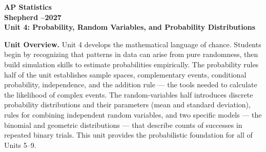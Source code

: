 \documentclass[10pt]{article}
\begin{document}
\vspace{-1.3in}

\begin{center}
  {\color{white}\bfseries\fontsize{28}{34}\selectfont AP Statistics}\\[8pt]
  {\color{goldacc}\bfseries\Large Shepherd --2027}\\[14pt]
  {\color{white}\bfseries\LARGE Unit 4: Probability, Random Variables, and Probability Distributions}\\[4pt]
\end{center}

\vspace{0.30in}

\begin{tcolorbox}[colback=sky,colframe=navy,boxrule=0.9pt,arc=2mm,
    left=4mm,right=4mm,top=3mm,bottom=3mm]
  \textbf{Unit Overview.}\quad
  Unit 4 develops the mathematical language of chance.  Students begin by recognizing
  that patterns in data can arise from pure randomness, then build simulation skills
  to estimate probabilities empirically.  The probability rules half of the unit
  establishes sample spaces, complementary events, conditional probability,
  independence, and the addition rule --- the tools needed to calculate the likelihood
  of complex events.  The random-variables half introduces discrete probability
  distributions and their parameters (mean and standard deviation), rules for combining
  independent random variables, and two specific models --- the binomial and geometric
  distributions --- that describe counts of successes in repeated binary trials.
  This unit provides the probabilistic foundation for all of Units 5--9.
\end{tcolorbox}

\vspace{0.22in}
\end{document}
